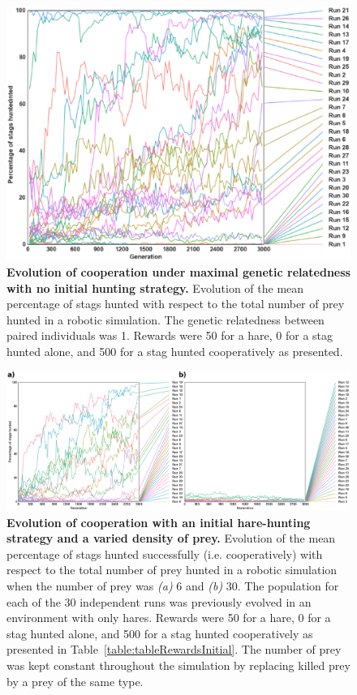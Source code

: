     \begin{figure}[hbtp]
      \centering
        \includegraphics[scale = 1]{fig/ArticleBio1/S2_Fig.eps}
      \caption{\textbf{Evolution of cooperation under maximal genetic relatedness with no initial hunting strategy.}
      Evolution of the mean percentage of stags hunted with respect to the total number of prey hunted in a robotic simulation. The genetic relatedness between paired individuals was 1. Rewards were 50 for a hare, 0 for a stag hunted alone, and 500 for a stag hunted cooperatively as presented.}
      \label{S2_Fig}
    \end{figure}

    \begin{figure}[hbtp]
      \centering
        \includegraphics[scale = 1]{fig/ArticleBio1/S3_Fig.eps}
      \caption{\textbf{Evolution of cooperation with an initial hare-hunting strategy and a varied density of prey.} 
      Evolution of the mean percentage of stags hunted successfully (i.e. cooperatively) with respect to the total number of prey hunted in a robotic simulation when the number of prey was {\em (a)} $6$ and {\em (b)} $30$. The population for each of the 30 independent runs was previously evolved in an environment with only hares. Rewards were 50 for a hare, 0 for a stag hunted alone, and 500 for a stag hunted cooperatively as presented in Table~\ref{table:tableRewardsInitial}. The number of prey was kept constant throughout the simulation by replacing killed prey by a prey of the same type.}
      \label{S3_Fig}
    \end{figure}